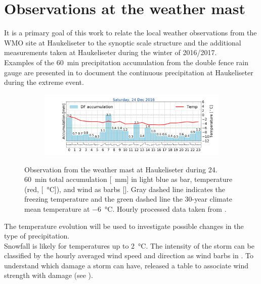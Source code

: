 \section{Observations at the weather mast}
\label{sec:loc_obs}
It is a primary goal of this work to relate the local weather observations from the WMO site at Haukeliseter to the synoptic scale structure and the additional measurements taken at Haukeliseter during the winter of 2016/2017.
\\
Examples of the \SI{60}{\minute} precipitation accumulation from the double fence rain gauge are presented in  to document the continuous precipitation at Haukeliseter during the extreme event. 
 \begin{figure}
 	\centering
 	\begin{subfigure}[b]{0.49\textwidth}
 		\includegraphics[trim={4.9cm 1.cm 1.5cm 1cm},clip,
 		width=\textwidth]{./fig_weathermast/T_P_U_20161224}
 	\end{subfigure}
 \caption{Observation from the weather mast at Haukeliseter during \SI{24}{\dec}. \SI{60}{\minute} total accumulation [\SI{}{\mm}] in light blue as bar, temperature (red, [\SI{}{\celsius}]), and wind as barbs [\SI{}{\mPs}]. Gray dashed line indicates the freezing temperature and the green dashed line the 30-year climate mean temperature at \SI{-6}{\celsius}. Hourly processed data taken from \cite{eklima_norwegian_2016}.} \label{fig:TPU}
 \end{figure}
The temperature evolution will be used to investigate possible changes in the type of precipitation. 
\\
Snowfall is likely for temperatures up to \SI{2}{\celsius}. The intensity of the storm can be classified by the hourly averaged wind speed and direction as wind barbs in \SI{}{\mPs}.
To understand which damage a storm can have, \cite{faeraas_urd_2016} released a table to associate wind strength with damage (see ).

% 
